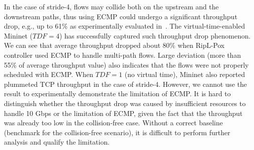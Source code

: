 In the case of stride-4, flows may collide both on the upstream and the downstream paths, thus using ECMP could undergo a significant throughput drop,
e.g., up to 61\% as experimentally evaluated in~\cite{Hedera}.
The virtual-time-enabled Mininet ($TDF=4$) has successfully captured such throughput drop phenomenon.
We can see that average throughput dropped about 80\% when RipL-Pox controller used ECMP to handle multi-path flows.
Large deviation (more than 55\% of average throughput value) also indicates that the flows were not properly scheduled with ECMP.
When $TDF=1$ (no virtual time), Mininet also reported plummeted TCP throughput in the case of stride-4.
However, we cannot use the result to experimentally demonstrate the limitation of ECMP.
It is hard to distinguish whether the throughput drop was caused by insufficient resources to handle 10 Gbps or the limitation of ECMP,
given the fact that the throughput was already too low in the collision-free case.
Without a correct baseline (benchmark for the collision-free scenario), it is difficult to perform further analysis and qualify the limitation.

